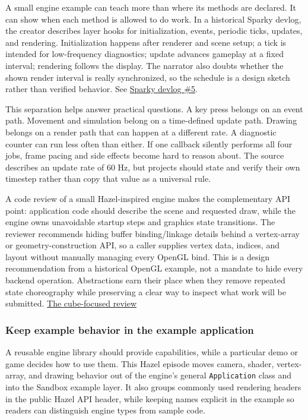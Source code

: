 A small engine example can teach more than where its methods are declared. It can show when each method is allowed to do work. In a historical Sparky devlog, the creator describes layer hooks for initialization, events, periodic ticks, updates, and rendering. Initialization happens after renderer and scene setup; a tick is intended for low-frequency diagnostics; update advances gameplay at a fixed interval; rendering follows the display. The narrator also doubts whether the shown render interval is really synchronized, so the schedule is a design sketch rather than verified behavior. See \href{https://www.youtube.com/watch?v=zqmgcQd6ayc&t=6m30s}{Sparky devlog \#5}.

This separation helps answer practical questions. A key press belongs on an event path. Movement and simulation belong on a time-defined update path. Drawing belongs on a render path that can happen at a different rate. A diagnostic counter can run less often than either. If one callback silently performs all four jobs, frame pacing and side effects become hard to reason about. The source describes an update rate of 60 Hz, but projects should state and verify their own timestep rather than copy that value as a universal rule.

A code review of a small Hazel-inspired engine makes the complementary API point: application code should describe the scene and requested draw, while the engine owns unavoidable startup steps and graphics state transitions. The reviewer recommends hiding buffer binding/linkage details behind a vertex-array or geometry-construction API, so a caller supplies vertex data, indices, and layout without manually managing every OpenGL bind. This is a design recommendation from a historical OpenGL example, not a mandate to hide every backend operation. Abstractions earn their place when they remove repeated state choreography while preserving a clear way to inspect what work will be submitted. \href{https://www.youtube.com/watch?v=sIAXLH7ZqCw&t=10m26s}{The cube-focused review}

\subsubsection{Keep example behavior in the example application}\label{keep-example-behavior-in-the-example-application}

A reusable engine library should provide capabilities, while a particular demo or game decides how to use them. This Hazel episode moves camera, shader, vertex-array, and drawing behavior out of the engine's general \texttt{Application} class and into the Sandbox example layer. It also groups commonly used rendering headers in the public Hazel API header, while keeping names explicit in the example so readers can distinguish engine types from sample code.

